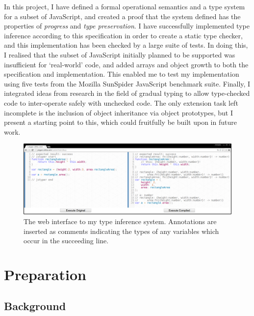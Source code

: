 \documentclass[12pt,a4paper,twoside,openright]{report}
\theoremstyle{definition}
\theoremstyle{dotless}
\begin{document}
In this project, I have defined a formal operational semantics and a type
system for a subset of JavaScript, and created a proof that the system defined
has the properties of \textit{progress} and \textit{type preservation}. I have
successfully implemented type inference according to this specification in
order to create a static type checker, and this implementation has been checked
by a large suite of tests. In doing this, I realised that the subset of
JavaScript initially planned to be supported was insufficient for `real-world'
code, and added arrays and object growth to both the specification and
implementation. This enabled me to test my implementation using five tests from
the Mozilla SunSpider JavaScript benchmark suite. Finally, I integrated ideas
from research in the field of gradual typing to allow type-checked code to
inter-operate safely with unchecked code. The only extension task left
incomplete is the inclusion of object inheritance via object prototypes, but I
present a starting point to this, which could fruitfully be built upon in
future work.

\begin{figure}
  \centering
  \includegraphics[width=160mm]{../res/web-interface.png}
  \caption[The web interface to my type inference system]{The web interface to my type inference system. Annotations are inserted as comments indicating the 
  	types of any variables which occur in the succeeding line.}
  \label{fig:web-interface}
\end{figure}






\chapter{Preparation}\label{preparation} 
\section{Background}
\end{document}
